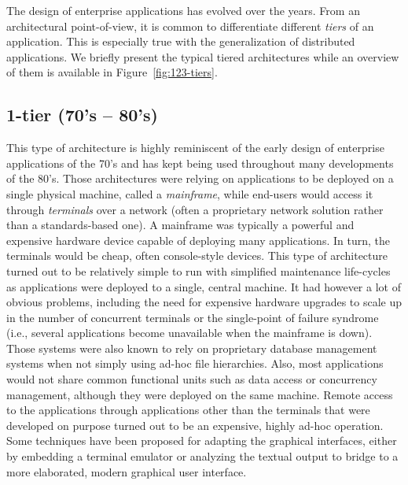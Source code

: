 The design of enterprise applications has evolved over the years. From an architectural point-of-view, it is common to differentiate different \emph{tiers} of an application. This is especially true with the generalization of distributed applications. We briefly present the typical tiered architectures while an overview of them is available in Figure~\ref{fig:123-tiers}. \\


\subsection{1-tier (70's -- 80's)}


This type of architecture is highly reminiscent of the early design of enterprise applications of the 70's and has kept being used throughout many developments of the 80's. Those architectures were relying on applications to be deployed on a single physical machine, called a \emph{mainframe}, while end-users would access it through \emph{terminals} over a network (often a proprietary network solution rather than a standards-based one). A mainframe was typically a powerful and expensive hardware device capable of deploying many applications. In turn, the terminals would be cheap, often console-style devices. This type of architecture turned out to be relatively simple to run with simplified maintenance life-cycles as applications were deployed to a single, central machine. It had however a lot of obvious problems, including the need for expensive hardware upgrades to scale up in the number of concurrent terminals or the single-point of failure syndrome (i.e., several applications become unavailable when the mainframe is down). Those systems were also known to rely on proprietary database management systems when not simply using ad-hoc file hierarchies. Also, most applications would not share common functional units such as data access or concurrency management, although they were deployed on the same machine. Remote access to the applications through applications other than the terminals that were developed on purpose turned out to be an expensive, highly ad-hoc operation. Some techniques have been proposed for adapting the graphical interfaces, either by embedding a terminal emulator or analyzing the textual output to bridge to a more elaborated, modern graphical user interface.\\

